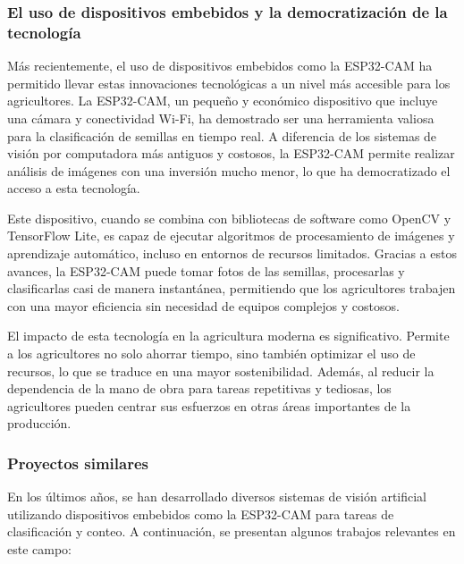 \subsubsection{El uso de dispositivos embebidos y la democratización de la tecnología}
Más recientemente, el uso de dispositivos embebidos como la ESP32-CAM ha permitido llevar estas innovaciones tecnológicas a un nivel más accesible para los agricultores. La ESP32-CAM, un pequeño y económico dispositivo que incluye una cámara y conectividad Wi-Fi, ha demostrado ser una herramienta valiosa para la clasificación de semillas en tiempo real. A diferencia de los sistemas de visión por computadora más antiguos y costosos, la ESP32-CAM permite realizar análisis de imágenes con una inversión mucho menor, lo que ha democratizado el acceso a esta tecnología.

Este dispositivo, cuando se combina con bibliotecas de software como OpenCV y TensorFlow Lite, es capaz de ejecutar algoritmos de procesamiento de imágenes y aprendizaje automático, incluso en entornos de recursos limitados. Gracias a estos avances, la ESP32-CAM puede tomar fotos de las semillas, procesarlas y clasificarlas casi de manera instantánea, permitiendo que los agricultores trabajen con una mayor eficiencia sin necesidad de equipos complejos y costosos.

El impacto de esta tecnología en la agricultura moderna es significativo. Permite a los agricultores no solo ahorrar tiempo, sino también optimizar el uso de recursos, lo que se traduce en una mayor sostenibilidad. Además, al reducir la dependencia de la mano de obra para tareas repetitivas y tediosas, los agricultores pueden centrar sus esfuerzos en otras áreas importantes de la producción.

\subsubsection{Proyectos similares}
En los últimos años, se han desarrollado diversos sistemas de visión artificial utilizando dispositivos embebidos como la ESP32-CAM para tareas de clasificación y conteo. A continuación, se presentan algunos trabajos relevantes en este campo:

